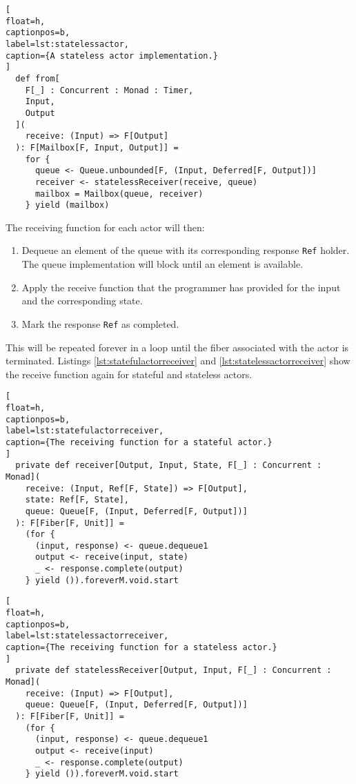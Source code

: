 \documentclass[../main.tex]{subfiles}
\begin{document}
\begin{lstlisting}[
float=h,
captionpos=b,
label=lst:statelessactor,
caption={A stateless actor implementation.}
]
  def from[
    F[_] : Concurrent : Monad : Timer,
    Input,
    Output
  ](
    receive: (Input) => F[Output]
  ): F[Mailbox[F, Input, Output]] =
    for {
      queue <- Queue.unbounded[F, (Input, Deferred[F, Output])]
      receiver <- statelessReceiver(receive, queue)
      mailbox = Mailbox(queue, receiver)
    } yield (mailbox)
\end{lstlisting}

The receiving function for each actor will then:

\begin{enumerate}
\item Dequeue an element of the queue with its corresponding response
  \texttt{Ref} holder. The queue implementation will block until an element is
  available.
\item Apply the receive function that the programmer has provided for the input
  and the corresponding state.
\item Mark the response \texttt{Ref} as completed.
\end{enumerate}

This will be repeated forever in a loop until the fiber associated with the
actor is terminated. Listings \ref{lst:statefulactorreceiver} and
\ref{lst:statelessactorreceiver} show the receive function again for stateful
and stateless actors.

\begin{lstlisting}[
float=h,
captionpos=b,
label=lst:statefulactorreceiver,
caption={The receiving function for a stateful actor.}
]
  private def receiver[Output, Input, State, F[_] : Concurrent : Monad](
    receive: (Input, Ref[F, State]) => F[Output],
    state: Ref[F, State],
    queue: Queue[F, (Input, Deferred[F, Output])]
  ): F[Fiber[F, Unit]] =
    (for {
      (input, response) <- queue.dequeue1
      output <- receive(input, state)
      _ <- response.complete(output)
    } yield ()).foreverM.void.start
\end{lstlisting}

\begin{lstlisting}[
float=h,
captionpos=b,
label=lst:statelessactorreceiver,
caption={The receiving function for a stateless actor.}
]
  private def statelessReceiver[Output, Input, F[_] : Concurrent : Monad](
    receive: (Input) => F[Output],
    queue: Queue[F, (Input, Deferred[F, Output])]
  ): F[Fiber[F, Unit]] =
    (for {
      (input, response) <- queue.dequeue1
      output <- receive(input)
      _ <- response.complete(output)
    } yield ()).foreverM.void.start
\end{lstlisting}
\end{document}

